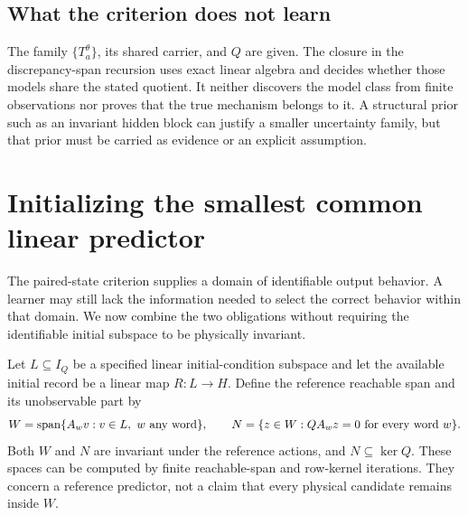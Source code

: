 \subsection{What the criterion does not learn}
The family $\{T_a^\theta\}$, its shared carrier, and $Q$ are given. The closure in the discrepancy-span recursion uses exact linear algebra and decides whether those models share the stated quotient. It neither discovers the model class from finite observations nor proves that the true mechanism belongs to it. A structural prior such as an invariant hidden block can justify a smaller uncertainty family, but that prior must be carried as evidence or an explicit assumption.

\section{Initializing the smallest common linear predictor}\label{GA:sec:linearpredictor}
The paired-state criterion supplies a domain of identifiable output behavior. A learner may still lack the information needed to select the correct behavior within that domain. We now combine the two obligations without requiring the identifiable initial subspace to be physically invariant.

Let $L\subseteq I_Q$ be a specified linear initial-condition subspace and let the available initial record be a linear map $R:L\to H$. Define the reference reachable span and its unobservable part by
\[
W=\operatorname{span}\{A_wv:v\in L,\ w\text{ any word}\},\qquad
N=\{z\in W:QA_wz=0\text{ for every word }w\}.
\]
Both $W$ and $N$ are invariant under the reference actions, and $N\subseteq\ker Q$. These spaces can be computed by finite reachable-span and row-kernel iterations. They concern a reference predictor, not a claim that every physical candidate remains inside $W$.

